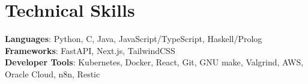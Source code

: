 \documentclass[letterpaper,11pt]{article}
\newcommand{\resumeSubHeadingListEnd}{\end{itemize}}
\begin{document}

%
\section{Technical Skills}
 \begin{itemize}[leftmargin=0.15in, label={}]
    \small{\item{
     \textbf{Languages}{: Python, C, Java, JavaScript/TypeScript}, Haskell/Prolog \\
     \textbf{Frameworks}{: FastAPI, Next.js, TailwindCSS} \\
     \textbf{Developer Tools}{: Kubernetes, Docker, React, Git, GNU make, Valgrind, AWS, Oracle Cloud, n8n, Restic} \\
    }}
 \end{itemize}


\end{document}
